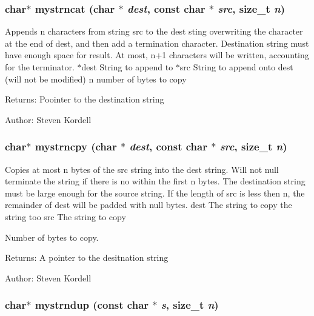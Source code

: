 \subsubsection{\setlength{\rightskip}{0pt plus 5cm}char$\ast$ mystrncat (char $\ast$ {\em dest}, const char $\ast$ {\em src}, size\_\-t {\em n})}\label{mystring_8h_8ccb44f981aac19c052eb611bc38b197}


Appends n characters from string src to the dest sting overwriting the  character at the end of dest, and then add a termination  character. Destination string must have enough space for result. At most, n+1 characters will be written, accounting for the terminator.  $\ast$dest String to append to  $\ast$src String to append onto dest (will not be modified)  n number of bytes to copy \begin{Desc}
\item[Returns:]Poointer to the destination string \end{Desc}
\begin{Desc}
\item[Author:]Steven Kordell \end{Desc}
\subsubsection{\setlength{\rightskip}{0pt plus 5cm}char$\ast$ mystrncpy (char $\ast$ {\em dest}, const char $\ast$ {\em src}, size\_\-t {\em n})}\label{mystring_8h_f8122b3dfcb26b56ac0505030e95adc5}


Copies at most n bytes of the src string into the dest string. Will not null terminate the string if there is no  within the first n bytes. The destination string must be large enough for the source string. If the length of src is less then n, the remainder of dest will be padded with null bytes.  dest The string to copy the string too  src The string to copy \par
 Number of bytes to copy. \begin{Desc}
\item[Returns:]A pointer to the desitnation string \end{Desc}
\begin{Desc}
\item[Author:]Steven Kordell \end{Desc}
\subsubsection{\setlength{\rightskip}{0pt plus 5cm}char$\ast$ mystrndup (const char $\ast$ {\em s}, size\_\-t {\em n})}\label{mystring_8h_d13d3e42cbb0fb06a9c5070850679f8f}


